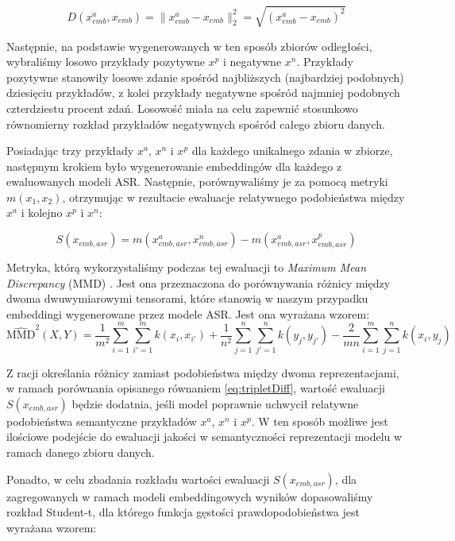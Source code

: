 \begin{equation}
    D(x_{emb}^a, x_{emb}) = \| x_{emb}^a - x_{emb} \|_2^2 = \sqrt{(x_{emb}^a - x_{emb})^2}
\end{equation}

Następnie, na podstawie wygenerowanych w ten sposób zbiorów odległości, wybraliśmy losowo przykłady pozytywne $x^p$ i negatywne $x^n$. Przykłady pozytywne stanowiły losowe zdanie spośród najbliższych (najbardziej podobnych) dziesięciu przykładów, z kolei przykłady negatywne spośród najmniej podobnych czterdziestu procent zdań. Losowość miała na celu zapewnić stosunkowo równomierny rozkład przykładów negatywnych spośród całego zbioru danych.

Posiadając trzy przykłady $x^a$, $x^n$ i $x^p$ dla każdego unikalnego zdania w zbiorze, następnym krokiem było wygenerowanie embeddingów dla każdego z ewaluowanych modeli ASR. Następnie, porównywaliśmy je za pomocą metryki $m(x_1, x_2)$, otrzymując w rezultacie ewaluacje relatywnego podobieństwa między $x^a$ i kolejno $x^p$ i $x^n$:

\begin{equation}
    S(x_{emb, asr}) = m(x_{emb, asr}^a, x_{emb, asr}^n) - m(x_{emb, asr}^a, x_{emb, asr}^p)
    \label{eq:tripletDiff}
\end{equation}

Metryka, którą wykorzystaliśmy podczas tej ewaluacji to \textit{Maximum Mean Discrepancy} (MMD) \cite{mmd}. Jest ona przeznaczona do porównywania różnicy między dwoma dwuwymiarowymi tensorami, które stanowią w naszym przypadku embeddingi wygenerowane przez modele ASR. Jest ona wyrażana wzorem:
\begin{equation}
\widehat{\text{MMD}}^2(X,Y) =
\frac{1}{m^2} \sum_{i=1}^{m} \sum_{i'=1}^{m} k(x_i, x_{i'})
+ \frac{1}{n^2} \sum_{j=1}^{n} \sum_{j'=1}^{n} k(y_j, y_{j'})
- \frac{2}{mn} \sum_{i=1}^{m} \sum_{j=1}^{n} k(x_i, y_j)
\label{eq:MMD}
\end{equation}

Z racji określania różnicy zamiast podobieństwa między dwoma reprezentacjami, w ramach porównania opisanego równaniem \ref{eq:tripletDiff}, wartość ewaluacji $S(x_{emb, asr})$ będzie dodatnia, jeśli model poprawnie uchwycił relatywne podobieństwa semantyczne przykładów $x^a$, $x^n$ i $x^p$. W ten sposób możliwe jest ilościowe podejście do ewaluacji jakości w semantyczności reprezentacji modelu w ramach danego zbioru danych.

Ponadto, w celu zbadania rozkładu wartości ewaluacji $S(x_{emb, asr})$, dla zagregowanych w ramach modeli embeddingowych wyników dopasowaliśmy rozkład Student-t, dla którego funkcja gęstości prawdopodobieństwa jest wyrażana wzorem:


